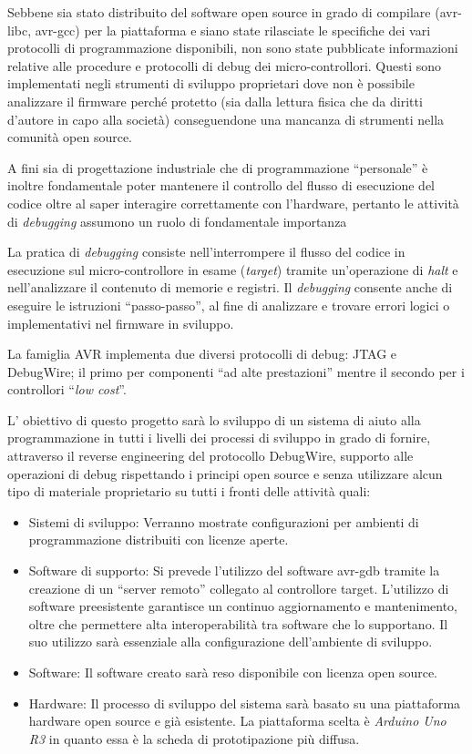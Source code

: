 Sebbene sia stato distribuito del software open source in grado di compilare (avr-libc\cite{site:avr-libc}, avr-gcc\cite{site:avr-gcc}) per la piattaforma e siano state rilasciate le specifiche dei vari protocolli di programmazione disponibili\cite{avr:appnote:isp}\cite{avr:appnote:tpi}\cite{avr:appnote:pdi}, non sono state pubblicate informazioni relative alle procedure e protocolli di debug dei micro-controllori. 
Questi sono implementati negli strumenti di sviluppo proprietari dove non è possibile analizzare il firmware perché protetto (sia dalla lettura fisica che da diritti d'autore in capo alla società) conseguendone una mancanza di strumenti nella comunità open source.

A fini sia di progettazione industriale che di programmazione ``personale'' è inoltre fondamentale poter mantenere il controllo del flusso di esecuzione del codice oltre al saper interagire correttamente con l'hardware, pertanto le attività di \textit{debugging} assumono un ruolo di fondamentale importanza

La pratica di \textit{debugging} consiste nell'interrompere il flusso del codice in esecuzione sul micro-controllore in esame (\textit{target}) tramite un'operazione di \textit{halt} e nell'analizzare il contenuto di memorie e registri. Il \textit{debugging} consente anche di eseguire le istruzioni ``passo-passo'', al fine di analizzare e trovare errori logici o implementativi nel firmware in sviluppo.

La famiglia AVR implementa due diversi protocolli di debug: JTAG e DebugWire; il primo per componenti ``ad alte prestazioni'' mentre il secondo per i controllori ``\textit{low cost}''.

L' obiettivo di questo progetto sarà lo sviluppo di un sistema di aiuto alla programmazione in tutti i livelli dei processi di sviluppo in grado di fornire, attraverso il reverse engineering del protocollo DebugWire\cite{site:dw-reverse-engeneering}, supporto alle operazioni di debug rispettando i principi open source e senza utilizzare alcun tipo di materiale proprietario su tutti i fronti delle attività quali:
\begin{itemize}
    \item Sistemi di sviluppo: Verranno mostrate configurazioni per ambienti di programmazione distribuiti con licenze aperte. 
    \item Software di supporto: Si prevede l'utilizzo del software avr-gdb\cite{site:gdb} tramite la creazione di un ``server remoto'' collegato al controllore target. L'utilizzo di software preesistente garantisce un continuo aggiornamento e mantenimento, oltre che permettere alta interoperabilità tra software che lo supportano. Il suo utilizzo sarà essenziale alla configurazione dell'ambiente di sviluppo.
    \item Software: Il software creato sarà reso disponibile con licenza open source.
    \item Hardware: Il processo di sviluppo del sistema sarà basato su una piattaforma hardware open source e già esistente. La piattaforma scelta è \textit{Arduino Uno R3} in quanto essa è la scheda di prototipazione più diffusa.
\end{itemize}


